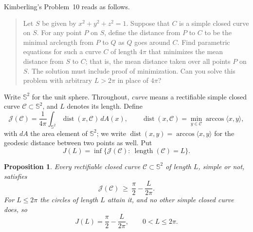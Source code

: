 \documentclass[11pt,oneside,reqno]{amsart}
\theoremstyle{plain}
\newtheorem{proposition}[theorem]{Proposition}
\theoremstyle{definition}
\DeclareMathOperator{\dist}{dist}
\DeclareMathOperator{\length}{length}
\newcommand{\Sph}{\mathbb{S}^{2}}
\begin{document}
Kimberling's Problem~10 \cite{Kimberling} reads as follows.
{\tiny
\begin{quote}
Let $S$ be given by $x^{2}+y^{2}+z^{2}=1$. Suppose that $C$ is a simple closed
curve on $S$. For any point $P$ on $S$, define the distance from $P$ to $C$ to
be the minimal arclength from $P$ to $Q$ as $Q$ goes around $C$. Find
parametric equations for such a curve $C$ of length $4\pi$ that minimizes the
mean distance from $S$ to $C$; that is, the mean distance taken over all points
$P$ on $S$. The solution must include proof of minimization. Can you solve this
problem with arbitrary $L>2\pi$ in place of $4\pi$?
\end{quote}
}
\noindent
Write $\Sph$ for the unit sphere. Throughout, \emph{curve} means a
rectifiable simple closed curve $\mathcal{C}\subset\Sph$, and $L$ denotes its
length. Define
\begin{equation}\label{eq:Jcal}
  \mathcal{J}(\mathcal{C})=\frac{1}{4\pi}\int_{\Sph}\dist(x,\mathcal{C})\,dA(x),
  \qquad
  \dist(x,\mathcal{C})=\min_{y\in \mathcal{C}}\arccos\langle x,y\rangle ,
\end{equation}
with $dA$ the area element of $\Sph$; we write $\dist(x,y)=\arccos\langle
x,y\rangle$ for the geodesic distance between two points as well. Put
\begin{equation}
  J(L)=\inf\bigl\{\mathcal{J}(\mathcal{C}):\ \length(\mathcal{C})=L\bigr\}.
\end{equation}

\begin{proposition}\label{prop:short}
Every rectifiable closed curve $\mathcal{C}\subset\Sph$ of length $L$, simple or
not, satisfies
\begin{equation}\label{eq:short}
  \mathcal{J}(\mathcal{C})\ \ge\ \frac{\pi}{2}-\frac{L}{2\pi} .
\end{equation}
For $L\le2\pi$ the circles of length $L$ attain it, and no other simple closed
curve does, so
\begin{equation}
  J(L)=\frac{\pi}{2}-\frac{L}{2\pi},\qquad 0<L\le2\pi .
\end{equation}
\end{proposition}
\end{document}
